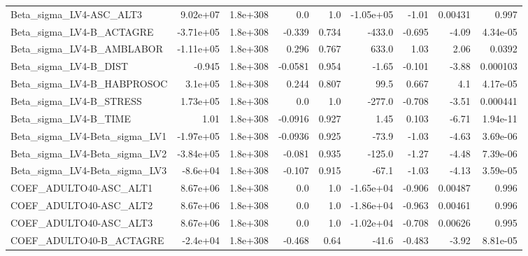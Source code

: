 \begin{tabular}{lrrrrrrrr}
Beta\_sigma\_LV4-ASC\_ALT3           &    9.02e+07 &     1.8e+308 &     0.0 &      1.0 &  -1.05e+05 &       -1.01 &      0.00431 &         0.997 \\
Beta\_sigma\_LV4-B\_ACTAGRE          &   -3.71e+05 &     1.8e+308 &  -0.339 &    0.734 &     -433.0 &      -0.695 &        -4.09 &      4.34e-05 \\
Beta\_sigma\_LV4-B\_AMBLABOR         &   -1.11e+05 &     1.8e+308 &   0.296 &    0.767 &      633.0 &        1.03 &         2.06 &        0.0392 \\
Beta\_sigma\_LV4-B\_DIST             &      -0.945 &     1.8e+308 & -0.0581 &    0.954 &      -1.65 &      -0.101 &        -3.88 &      0.000103 \\
Beta\_sigma\_LV4-B\_HABPROSOC        &     3.1e+05 &     1.8e+308 &   0.244 &    0.807 &       99.5 &       0.667 &          4.1 &      4.17e-05 \\
Beta\_sigma\_LV4-B\_STRESS           &    1.73e+05 &     1.8e+308 &     0.0 &      1.0 &     -277.0 &      -0.708 &        -3.51 &      0.000441 \\
Beta\_sigma\_LV4-B\_TIME             &        1.01 &     1.8e+308 & -0.0916 &    0.927 &       1.45 &       0.103 &        -6.71 &      1.94e-11 \\
Beta\_sigma\_LV4-Beta\_sigma\_LV1     &   -1.97e+05 &     1.8e+308 & -0.0936 &    0.925 &      -73.9 &       -1.03 &        -4.63 &      3.69e-06 \\
Beta\_sigma\_LV4-Beta\_sigma\_LV2     &   -3.84e+05 &     1.8e+308 &  -0.081 &    0.935 &     -125.0 &       -1.27 &        -4.48 &      7.39e-06 \\
Beta\_sigma\_LV4-Beta\_sigma\_LV3     &    -8.6e+04 &     1.8e+308 &  -0.107 &    0.915 &      -67.1 &       -1.03 &        -4.13 &      3.59e-05 \\
COEF\_ADULTO40-ASC\_ALT1            &    8.67e+06 &     1.8e+308 &     0.0 &      1.0 &  -1.65e+04 &      -0.906 &      0.00487 &         0.996 \\
COEF\_ADULTO40-ASC\_ALT2            &    8.67e+06 &     1.8e+308 &     0.0 &      1.0 &  -1.86e+04 &      -0.963 &      0.00461 &         0.996 \\
COEF\_ADULTO40-ASC\_ALT3            &    8.67e+06 &     1.8e+308 &     0.0 &      1.0 &  -1.02e+04 &      -0.708 &      0.00626 &         0.995 \\
COEF\_ADULTO40-B\_ACTAGRE           &    -2.4e+04 &     1.8e+308 &  -0.468 &     0.64 &      -41.6 &      -0.483 &        -3.92 &      8.81e-05 \\

\end{tabular}
